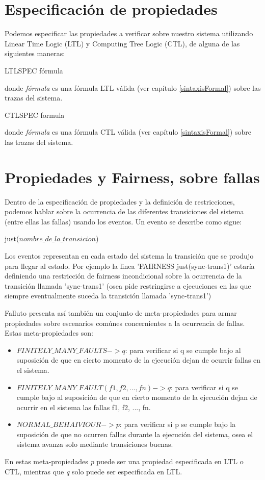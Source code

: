 \documentclass[titlepage, 12pt]{book}
\begin{document}
\section{Especificaci\'on de propiedades}
Podemos especificar las propiedades a verificar sobre nuestro sistema utilizando Linear Time Logic (LTL) y Computing Tree Logic (CTL), de alguna de las siguientes maneras:

\begin{center}LTLSPEC f\'ormula\end{center}
donde \textit{f\'ormula} es una f\'ormula LTL v\'alida (ver cap\'itulo \ref{sintaxisFormal}) sobre las trazas del sistema.

\begin{center}CTLSPEC formula\end{center}
donde \textit{f\'ormula} es una f\'ormula CTL v\'alida (ver cap\'itulo \ref{sintaxisFormal}) sobre las trazas del sistema.

\section{Propiedades y Fairness, sobre fallas}
Dentro de la especificaci\'on de propiedades y la definici\'on de restricciones, podemos hablar sobre la ocurrencia de las diferentes transiciones del sistema (entre ellas las fallas) usando los eventos. Un evento se describe como sigue:
\begin{center}just($nombre\_de\_la\_transicion$)\end{center}
Los eventos representan en cada estado del sistema la transici\'on que se produjo para llegar al estado. Por ejemplo la linea 'FAIRNESS just(sync-trans1)' estar\'ia definiendo una restricci\'on de fairness incondicional sobre la ocurrencia de la transici\'on llamada 'sync-trans1' (osea pide restringirse a ejecuciones en las que siempre eventualmente suceda la transici\'on llamada 'sync-trans1')

Falluto presenta as\'i tambi\'en un conjunto de meta-propiedades para armar propiedades sobre escenarios com\'unes concernientes a la ocurrencia de fallas. Estas meta-propiedades son:
\begin{itemize}
\item $FINITELY\_MANY\_FAULTS -> q$: para verificar si q se cumple bajo al suposici\'on de que en cierto momento de la ejecuci\'on dejan de ocurrir fallas en el sistema.
\item $FINITELY\_MANY\_FAULT(f1, f2, ..., fn) -> q$: para verificar si q se cumple bajo al suposici\'on de que en cierto momento de la ejecuci\'on dejan de ocurrir en el sistema las fallas f1, f2, ..., fn.
\item $NORMAL\_BEHAIVIOUR -> p$: para verificar si p se cumple bajo la suposici\'on de que no ocurren fallas durante la ejecuci\'on del sistema, osea el sistema avanza solo mediante transiciones buenas.
\end{itemize}
En estas meta-propiedades \textit{p} puede ser una propiedad especificada en LTL o CTL, mientras que \textit{q} solo puede ser especificada en LTL.
\end{document}
